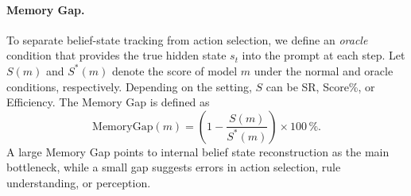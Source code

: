 \paragraph{Memory Gap.}
To separate belief-state tracking from action selection, we define an \emph{oracle} condition that provides the true hidden state $s_t$ into the prompt at each step. Let $S(m)$ and $S^*(m)$ denote the score of model $m$ under the normal and oracle conditions, respectively. Depending on the setting, $S$ can be SR, Score\%, or Efficiency. The Memory Gap is defined as
\begin{equation}
\label{eq:memorygap}
\text{MemoryGap}(m) = \left(1 - \frac{S(m)}{S^*(m)}\right) \times 100\,\%.
\end{equation}
A large Memory Gap points to internal belief state reconstruction as the main bottleneck, while a small gap suggests errors in action selection, rule understanding, or perception.
